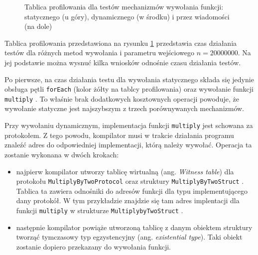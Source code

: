 \documentclass[mgr, shortabstract]{iithesis}
\newcommand{\ang}[1]{ang. \textit{#1}}
\newcommand{\swiftinline}[1]{
    \texttt{#1}
}
\begin{document}
\begin{figure}
    \caption{Tablica profilowania dla testów mechanizmów wywołania funkcji: statycznego (u góry), dynamicznego (w środku) i przez wiadomości (na dole)}
    \label{i:dispatch_method}
\end{figure}

Tablica profilowania przedstawiona na rysunku \ref{i:dispatch_method} przedstawia czas działania testów dla różnych metod wywołania i parametru wejściowego $n = 20000000$. Na jej podstawie można wysnuć kilka wniosków odnośnie czasu działania testów.

Po pierwsze, na czas działania testu dla wywołania statycznego składa się jedynie obsługa pętli \swiftinline{forEach} (kolor żółty na tablcy profilowania) oraz wywołanie funkcji \swiftinline{multiply}. To właśnie brak dodatkowych kosztownych operacji powoduje, że wywołanie statyczne jest najszybszym z trzech porównywanych mechanizmów.

Przy wywołaniu dynamicznym, implementacja funkcji \swiftinline{multiply} jest schowana za protokołem. Z tego powodu, kompilator musi w trakcie działania programu znaleźć adres do odpowiedniej implementacji, którą należy wywołać. Operacja ta zostanie wykonana w dwóch krokach:

\begin{itemize}
    \item najpierw kompilator utworzy tablicę wirtualną (\ang{Witness table}) dla protokołu \swiftinline{MultiplyByTwoProtocol} oraz struktury \swiftinline{MultiplyByTwoStruct}. Tablica ta zawiera odnośniki do adresów funkcji dla typu implementującego dany protokół. W tym przykładzie znajdzie się tam adres implentacji dla funkcji \swiftinline{multiply} w strukturze \swiftinline{MultiplybyTwoStruct}.
    \item następnie kompilator powiąże utworzoną tablicę z danym obiektem struktury tworząć tymczasowy typ egzystencyjny (\ang{existential type}). Taki obiekt zostanie dopiero przekazany do wywołania funkcji.
\end{itemize}
\end{document}
